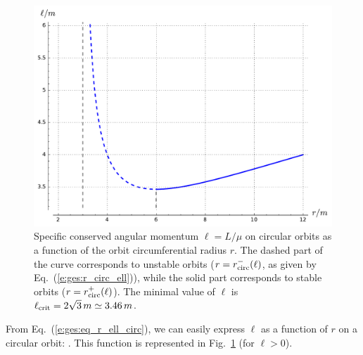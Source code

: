\begin{figure}
\centerline{\includegraphics[height=0.4\textheight]{ges_ell_circ_orbit.pdf}}
\caption[]{\label{f:ges:ell_circ_orbit} \footnotesize
Specific conserved angular momentum $\ell = L/\mu$
on circular orbits as a function of the
orbit circumferential radius $r$. The dashed part of the curve
corresponds to unstable orbits ($r=r_{\rm circ}^-(\ell)$, as given by Eq.~(\ref{e:ges:r_circ_ell})), while
the solid part corresponds to stable orbits ($r=r_{\rm circ}^+(\ell)$).
The minimal value of $\ell$ is $\ell_{\rm crit} = 2\sqrt{3}\, m \simeq 3.46\, m$.}
\end{figure}

From Eq.~(\ref{e:ges:eq_r_ell_circ}), we can easily express $\ell$
as a function of $r$ on a circular orbit:
\be \label{e:ges:ell_r_circ}
     .
\ee
This function is represented in Fig.~\ref{f:ges:ell_circ_orbit} (for $\ell > 0$).

